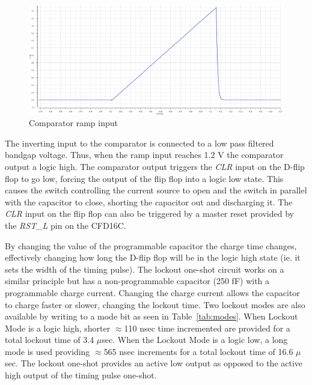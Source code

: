\documentclass[12pt,oneside,final]{siuethesis}
\theoremstyle{definition}
\begin{document}
\begin{figure}[htbp!]
\centering
\includegraphics[scale=.3,keepaspectratio=true]{./ch3_figures/ramp.png} 
\caption{Comparator ramp input}
\label{fig:ramp}
\end{figure}

\par The inverting input to the comparator is connected to a low pass filtered bandgap voltage. Thus, when the ramp input reaches 1.2 V the comparator output a logic high. The comparator output triggers the \emph{CLR} input on the D-flip flop to go low, forcing the output of the flip flop into a logic low state. This causes the switch controlling the current source to open and the switch in parallel with the capacitor to close, shorting the capacitor out and discharging it. The \emph{CLR} input on the flip flop can also be triggered by a master reset provided by the \emph{RST\_L} pin on the CFD16C. 

\par By changing the value of the programmable capacitor the charge time changes, effectively changing how long the D-flip flop will be in the logic high state (ie. it sets the width of the timing pulse). The lockout one-shot circuit works on a similar principle but has a non-programmable capacitor (250 fF) with a programmable charge current. Changing the charge current allows the capacitor to charge faster or slower, changing the lockout time. Two lockout modes are also available by writing to a mode bit as seen in Table~\ref{tab:modes}. When Lockout Mode is a logic high, shorter $\approx$110 nsec time incremented are provided for a total lockout time of 3.4 $\mu$sec. When the Lockout Mode is a logic low, a long mode is used providing $\approx$565 nsec increments for a total lockout time of 16.6 $\mu$sec. The lockout one-shot provides an active low output as opposed to the active high output of the timing pulse one-shot.
\end{document}

